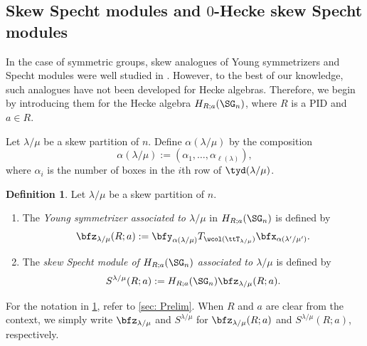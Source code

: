 \documentclass[12pt, reqno]{amsart}
\theoremstyle{plain}
\theoremstyle{definition}
\newtheorem{definition}[definition]{Definition}
\numberwithin{equation}{section}
\numberwithin{figure}{section}
\numberwithin{table}{section}
\begin{document}
\subsection{Skew Specht modules and $0$-Hecke skew Specht modules}\label{subsec: 0-Hecke module from specialization 1}






In the case of symmetric groups, skew analogues of Young symmetrizers and Specht modules were well studied in \cite{79PJ, 89GW}. However, to the best of our knowledge, such analogues have not been developed for Hecke algebras. Therefore, we begin by introducing them for the Hecke algebra $H_{R;a}(\SG_n)$, where $R$ is a PID and $a \in R$.




Let $\lambda/\mu$ be a skew partition of  $n$.
Define $\alpha(\lambda/\mu)$ by the composition 
\[
\alpha(\lambda/\mu) := (\alpha_1, \ldots, \alpha_{\ell(\lambda)}),
\]
where $\alpha_i$ is the number of boxes in the $i$th row of $\tyd(\lambda/\mu)$.

\begin{definition}\label{def: skew Young sym and skew Specht}
Let $\lambda/\mu$ be a skew partition of  $n$.
\begin{enumerate}
\item The \emph{Young symmetrizer 
associated to $\lambda/\mu$} in $H_{R;a}(\SG_n)$ is defined by 
\begin{align*}
\bfz_{\lambda/\mu}(R;a) := \bfy_{\alpha(\lambda/\mu)} T_{\wcol(\ttT_{\lambda/\mu})} \bfx_{\alpha(\lambda'/\mu')}.
\end{align*}
\item
The \emph{skew Specht module  of $H_{R;a}(\SG_n)$ associated to $\lambda/\mu$} is defined by 
\begin{align*}
S^{\lambda/\mu}(R;a) := H_{R;a}(\SG_n)\bfz_{\lambda/\mu}(R;a).
\end{align*}
\end{enumerate}
\end{definition}

For the notation in \cref{def: skew Young sym and skew Specht}, refer to \cref{sec: Prelim}.
When $R$ and $a$ are clear from the context, we simply write $\bfz_{\lambda/\mu}$ and $S^{\lambda/\mu}$ for $\bfz_{\lambda/\mu}(R;a)$ and $S^{\lambda/\mu}(R;a)$, respectively.
\end{document}
